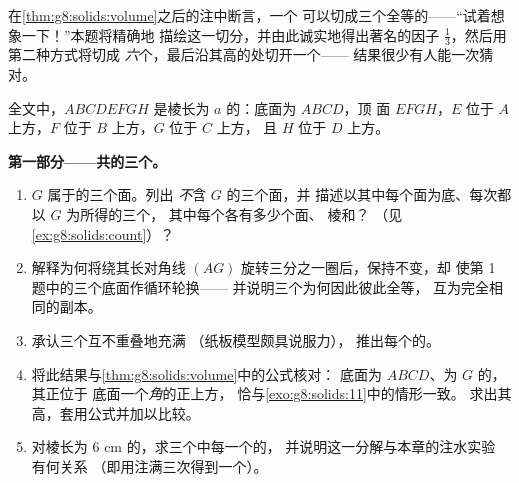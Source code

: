 \begin{problem}
\label{pb:g8:solids:1}
在\cref{thm:g8:solids:volume}之后的注中断言，一个
可以切成三个全等的——“试着想象一下！”本题将精确地
描绘这一切分，并由此诚实地得出著名的因子
$\frac13$，然后用第二种方式将切成
\emph{六}个，最后沿其高的处切开一个——
结果很少有人能一次猜对。

全文中，$ABCDEFGH$ 是棱长为 $a$ 的：底面为 $ABCD$，顶
面 $EFGH$，$E$ 位于 $A$ 上方，$F$ 位于 $B$ 上方，$G$ 位于 $C$ 上方，
且 $H$ 位于 $D$ 上方。

\medskip
\noindent\textbf{第一部分——共的三个。}
\begin{enumerate}
  \item {} $G$ 属于的三个面。列出
        \emph{不}含 $G$ 的三个面，并
        描述以其中每个面为底、每次都以 $G$ 为所得的三个，
        其中每个各有多少个面、
        棱和？
        （见\cref{ex:g8:solids:count}）？
  \item 解释为何将绕其长对角线
        $(AG)$ 旋转三分之一圈后，保持不变，却
        使第 1 题中的三个底面作循环轮换——
        并说明三个为何因此彼此全等，
        互为完全相同的副本。
  \item 承认三个互不重叠地充满
        （纸板模型颇具说服力），
        推出每个的。
  \item 将此结果与\cref{thm:g8:solids:volume}中的公式核对：
        底面为 $ABCD$、为 $G$ 的，其正位于
        底面一个\emph{角}的正上方，
        恰与\cref{exo:g8:solids:11}中的情形一致。
        求出其高，套用公式并加以比较。
  \item 对棱长为 $6$ cm 的，求三个中每一个的，
        并说明这一分解与本章的注水实验
        有何关系
        （即用注满三次得到一个）。
\end{enumerate}


\end{problem}

